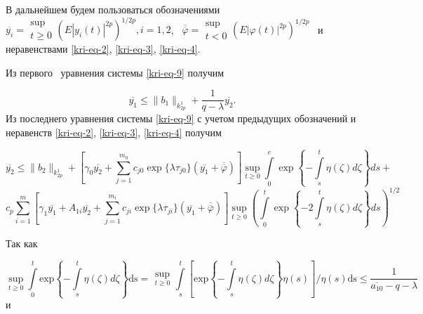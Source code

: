 В дальнейшем будем пользоваться обозначениями \  $\overline{y_i}=\begin{matrix}\sup\\t\ge
0\end{matrix}\left(E|y_i(t)|^{2p}\right)^{1/2p},i=1,2$, \  $\overline{\overline{\varphi
}}=\begin{matrix}\sup\\t<0\end{matrix}\left(E|\varphi (t)|^{2p}\right)^{1/2p}$ \ и неравенствами \eqref{kri-eq-2}, \eqref{kri-eq-3}, \eqref{kri-eq-4}.

Из первого \ уравнения системы \eqref{kri-eq-9} получим

\begin{equation*}
\overline{y_1}\le \|b_1\|_{k_{2p}^1}+\frac 1{q-\lambda }\overline{y_2}.
\end{equation*}
Из последнего уравнения системы \eqref{kri-eq-9} с учетом предыдущих обозначений и неравенств \eqref{kri-eq-2}, \eqref{kri-eq-3}, \eqref{kri-eq-4} получим

\begin{equation*}
  \overline{y_2} \leq \|b_2\|_{k_{2p}^1} + \left[ \gamma_0 \overline{y_2} + \sum\limits_{j=1}^{m_0} c_{j0} \exp\{\lambda\tau_{j0}\}(\overline{y_1}+\overline{\overline{\varphi}}) \right] 
\sup\limits_{t\geq0} \int\limits_{0}^{e} \exp\left\{-\int\limits_{s}^{t} \eta(\zeta)d\zeta\right\}ds + 
\end{equation*}
\begin{equation}\label{kri-eq-10}
c_p \sum\limits_{i=1}^{m} \left[\gamma_1\overline{y_1}+A_{1i}\overline{y_2}+\sum\limits_{j=1}^{m_i} c_{ji}\exp \{\lambda\tau_{ji}\}(\overline{y_1}+\overline{\overline{\varphi}})\right] 
\sup\limits_{t\geq0} \left(\int\limits_{0}^{t}\exp\left\{ -2\int\limits_{s}^{t} \eta(\zeta)d\zeta \right\} ds \right)^{1/2} 
\end{equation}

Так как

\begin{equation*}
\sup\limits_{t\ge 0}\overset t{\underset 0{\int }}\text{exp}\left\{-\overset t{\underset s{\int
}}\eta (\zeta )\mathit{d\zeta }\right\}\text{ds}=\begin{matrix}\sup\limits_{t\ge
0}\end{matrix}\overset t{\underset s{\int }}\left[\text{exp}\left\{-\overset t{\underset s{\int }}\eta (\zeta
)\mathit{d\zeta }\right\}\eta (s)\right]/\eta (s)\text{ds}\le \frac 1{\overline{a_{10}}-q-\lambda }
\end{equation*}
и

